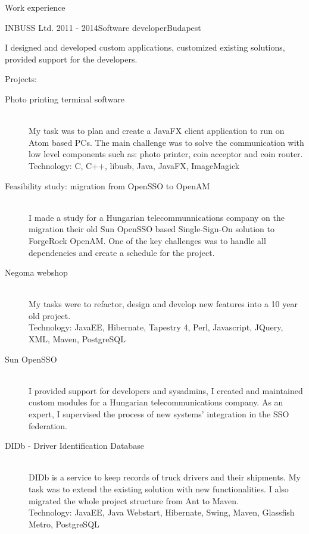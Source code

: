 \documentclass{resume} %
\begin{document}
\begin{rSection}{Work experience}
\begin{rSubsection}{INBUSS Ltd.}
{2011 - 2014}{Software developer}{Budapest}
\item I designed and developed custom applications, customized existing solutions, provided support for the developers.
\item Projects:
	\begin{description}
		\item[Photo printing terminal software] \hfill \\
		My task was to plan and create a JavaFX client application to run on Atom based PCs.
		The main challenge was to solve the communication with low level components such as: photo printer,
		coin acceptor and coin router. \\
		Technology: C, C++, libusb, Java, JavaFX, ImageMagick
		\item[Feasibility study: migration from OpenSSO to OpenAM] \hfill \\
		I made a study for a Hungarian telecommunnications company on the migration their old Sun OpenSSO based
		Single-Sign-On solution to ForgeRock OpenAM.
		One of the key challenges was to handle all dependencies and create a schedule for the project.
		\item[Negoma webshop] \hfill \\
		My tasks were to refactor, design and develop new features into a 10 year old project. \\
		Technology: JavaEE, Hibernate, Tapestry 4, Perl, Javascript, JQuery, XML, Maven, PostgreSQL
		\item[Sun OpenSSO] \hfill \\
		I provided support for developers and sysadmins, I created and maintained custom modules for
		a Hungarian telecommunications company. As an expert, I supervised the process of
		new systems' integration in the SSO federation.
		\item[DIDb - Driver Identification Database] \hfill \\
		DIDb is a service to keep records of truck drivers and their shipments.
		My task was to extend the existing solution with new functionalities.
		I also migrated the whole project structure from Ant to Maven. \\
		Technology: JavaEE, Java Webstart, Hibernate, Swing, Maven, Glassfish Metro,
		PostgreSQL
	\end{description}
\end{rSubsection}



\end{rSection}
\end{document}
